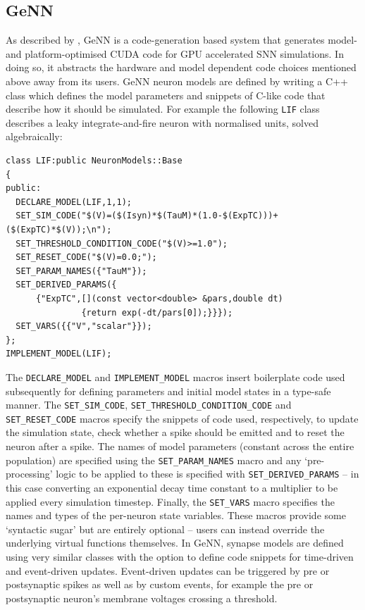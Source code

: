 \documentclass[utf8]{frontiersSCNS} %
\begin{document}
\subsection{GeNN}
\label{sec:method/genn}
As described by \citet{Yavuz2016}, GeNN is a code-generation based system that generates model- and platform-optimised CUDA code for GPU accelerated SNN simulations. In doing so, it abstracts the hardware and model dependent code choices mentioned above away from its users.
GeNN neuron models are defined by writing a C++ class which defines the model parameters and snippets of C-like code that describe how it should be simulated.
For example the following \lstinline{LIF} class describes a leaky integrate-and-fire neuron with normalised units, solved algebraically:
%
\begin{lstlisting}
class LIF:public NeuronModels::Base
{
public:
  DECLARE_MODEL(LIF,1,1);
  SET_SIM_CODE("$(V)=($(Isyn)*$(TauM)*(1.0-$(ExpTC)))+($(ExpTC)*$(V));\n");
  SET_THRESHOLD_CONDITION_CODE("$(V)>=1.0");
  SET_RESET_CODE("$(V)=0.0;");
  SET_PARAM_NAMES({"TauM"});
  SET_DERIVED_PARAMS({
      {"ExpTC",[](const vector<double> &pars,double dt)
               {return exp(-dt/pars[0]);}}});
  SET_VARS({{"V","scalar"}});
};
IMPLEMENT_MODEL(LIF);
\end{lstlisting}
%
The \lstinline{DECLARE_MODEL} and \lstinline{IMPLEMENT_MODEL} macros insert boilerplate code used subsequently for defining parameters and initial model states in a type-safe manner.
The \lstinline{SET_SIM_CODE}, \lstinline{SET_THRESHOLD_CONDITION_CODE} and \lstinline{SET_RESET_CODE} macros specify the snippets of code used, respectively, to update the simulation state, check whether a spike should be emitted and to reset the neuron after a spike.
The names of model parameters (constant across the entire population) are specified using the \lstinline{SET_PARAM_NAMES} macro and any `pre-processing' logic to be applied to these is specified with \lstinline{SET_DERIVED_PARAMS} -- in this case converting an exponential decay time constant to a multiplier to be applied every simulation timestep.
Finally, the \lstinline{SET_VARS} macro specifies the names and types of the per-neuron state variables.
These macros provide some `syntactic sugar' but are entirely optional -- users can instead override the underlying virtual functions themselves.
In GeNN, synapse models are defined using very similar classes with the option to define code snippets for time-driven and event-driven updates.
Event-driven updates can be triggered by pre or postsynaptic spikes as well as by custom events, for example the pre or postsynaptic neuron's membrane voltages crossing a threshold.
\end{document}
